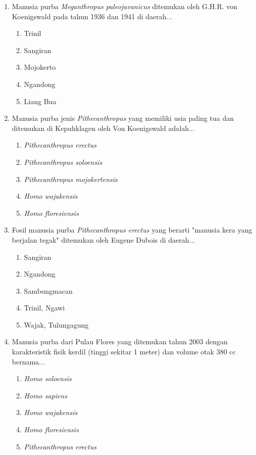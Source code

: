 \documentclass[12pt, a4paper]{article}
\begin{document}
\begin{enumerate}[label=\arabic*.]
    \item Manusia purba \textit{Meganthropus paleojavanicus} ditemukan oleh G.H.R. von Koenigswald pada tahun 1936 dan 1941 di daerah...
    \begin{enumerate}[label=\Alph*.]
        \item Trinil
        \item Sangiran
        \item Mojokerto
        \item Ngandong
        \item Liang Bua
    \end{enumerate}

    \item Manusia purba jenis \textit{Pithecanthropus} yang memiliki usia paling tua dan ditemukan di Kepuhklagen oleh Von Koenigswald adalah...
    \begin{enumerate}[label=\Alph*.]
        \item \textit{Pithecanthropus erectus}
        \item \textit{Pithecanthropus soloensis}
        \item \textit{Pithecanthropus mojokertensis}
        \item \textit{Homo wajakensis}
        \item \textit{Homo floresiensis}
    \end{enumerate}

    \item Fosil manusia purba \textit{Pithecanthropus erectus} yang berarti "manusia kera yang berjalan tegak" ditemukan oleh Eugene Dubois di daerah...
    \begin{enumerate}[label=\Alph*.]
        \item Sangiran
        \item Ngandong
        \item Sambungmacan
        \item Trinil, Ngawi
        \item Wajak, Tulungagung
    \end{enumerate}

    \item Manusia purba dari Pulau Flores yang ditemukan tahun 2003 dengan karakteristik fisik kerdil (tinggi sekitar 1 meter) dan volume otak 380 cc bernama...
    \begin{enumerate}[label=\Alph*.]
        \item \textit{Homo soloensis}
        \item \textit{Homo sapiens}
        \item \textit{Homo wajakensis}
        \item \textit{Homo floresiensis}
        \item \textit{Pithecanthropus erectus}
    \end{enumerate}


\end{enumerate}
\end{document}
